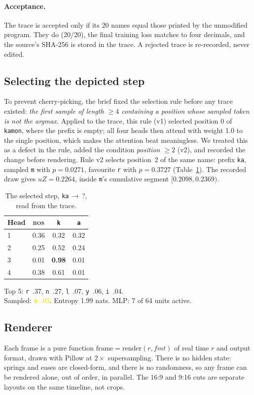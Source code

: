 \documentclass[10pt,twocolumn]{article}
\newcommand{\tok}[1]{\texttt{#1}}
\begin{document}
\paragraph{Acceptance.} The trace is accepted only if its 20 names equal those printed by the unmodified program.
They do (20/20), the final training loss matches to four decimals, and the source's SHA-256 is stored in the trace.
A rejected trace is re-recorded, never edited.

\subsection{Selecting the depicted step}\label{sec:select}
To prevent cherry-picking, the brief fixed the selection rule before any trace existed:
\emph{the first sample of length $\ge 4$ containing a position whose sampled token is not the argmax.}
Applied to the trace, this rule (v1) selected position 0 of \tok{kamon}, where the prefix is empty;
all four heads then attend with weight 1.0 to the single position, which makes the attention beat meaningless.
We treated this as a defect in the rule, added the condition \emph{position $\ge 2$} (v2), and recorded the change
before rendering. Rule v2 selects position~2 of the same name: prefix \tok{ka}, sampled \tok{m} with $p=0.0271$,
favourite \tok{r} with $p=0.3727$ (Table~\ref{tab:step}). The recorded draw gives $uZ=0.2264$, inside
\tok{m}'s cumulative segment $[0.2098, 0.2369)$.

\begin{table}[t]
\centering\small
\begin{tabular}{@{}lccc@{}}
\toprule
Head & \textsc{bos} & \tok{k} & \tok{a} \\
\midrule
1 & 0.36 & 0.32 & 0.32 \\
2 & 0.25 & 0.52 & 0.24 \\
3 & 0.01 & \textbf{0.98} & 0.01 \\
4 & 0.38 & 0.61 & 0.01 \\
\bottomrule
\end{tabular}

\smallskip\raggedright
Top 5: \tok{r}~.37, \tok{n}~.27, \tok{l}~.07, \tok{y}~.06, \tok{i}~.04.\\
Sampled: \textcolor{gold}{\tok{m}~.03}. Entropy 1.99 nats. MLP: 7 of 64 units active.
\caption{The selected step, \tok{ka}$\,\to\,$?, read from the trace.}
\label{tab:step}
\end{table}

\subsection{Renderer}\label{sec:render}
Each frame is a pure function $\mathrm{frame} = \mathrm{render}(r, \mathit{fmt})$ of real time $r$ and output format,
drawn with Pillow at $2\times$ supersampling. There is no hidden state: springs and eases are closed-form,
and there is no randomness, so any frame can be rendered alone, out of order, in parallel.
The 16:9 and 9:16 cuts are separate layouts on the same timeline, not crops.
\end{document}

